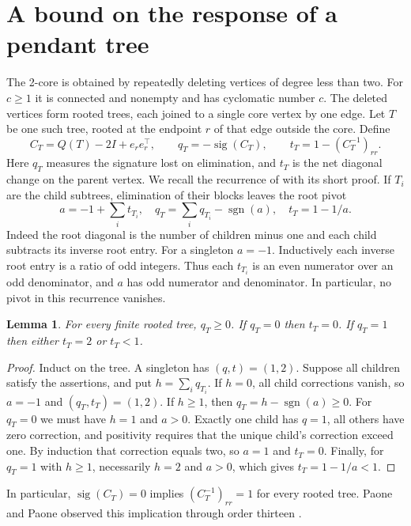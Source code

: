 \documentclass[11pt]{article}
\newtheorem{lemma}[theorem]{Lemma}
\newcommand{\sg}{\operatorname{sig}}
\begin{document}
\section{A bound on the response of a pendant tree}
The 2-core is obtained by repeatedly deleting vertices of degree less than two. For $c\ge1$ it is connected and nonempty and has cyclomatic number $c$. The deleted vertices form rooted trees, each joined to a single core vertex by one edge. Let $T$ be one such tree, rooted at the endpoint $r$ of that edge outside the core. Define
\[
 C_T=Q(T)-2I+e_re_r^\top,\qquad
 q_T=-\sg(C_T),\qquad t_T=1-(C_T^{-1})_{rr}.
\]
Here $q_T$ measures the signature lost on elimination, and $t_T$ is the net diagonal change on the parent vertex. We recall the recurrence of \cite[Lemma 3.5 and Proposition 3.7]{pp} with its short proof. If $T_i$ are the child subtrees, elimination of their blocks leaves the root pivot
\begin{equation}\label{eq:rec}
 a=-1+\sum_i t_{T_i},\quad
 q_T=\sum_i q_{T_i}-\operatorname{sgn}(a),\quad
 t_T=1-1/a.
\end{equation}
Indeed the root diagonal is the number of children minus one and each child subtracts its inverse root entry. For a singleton $a=-1$. Inductively each inverse root entry is a ratio of odd integers. Thus each $t_{T_i}$ is an even numerator over an odd denominator, and $a$ has odd numerator and denominator. In particular, no pivot in this recurrence vanishes.

\begin{lemma}\label{lem:tree}
For every finite rooted tree, $q_T\ge0$. If $q_T=0$ then $t_T=0$. If $q_T=1$ then either $t_T=2$ or $t_T<1$.
\end{lemma}
\begin{proof}
Induct on the tree. A singleton has $(q,t)=(1,2)$. Suppose all children satisfy the assertions, and put $h=\sum_i q_{T_i}$. If $h=0$, all child corrections vanish, so $a=-1$ and $(q_T,t_T)=(1,2)$. If $h\ge1$, then $q_T=h-\operatorname{sgn}(a)\ge0$. For $q_T=0$ we must have $h=1$ and $a>0$. Exactly one child has $q=1$, all others have zero correction, and positivity requires that the unique child's correction exceed one. By induction that correction equals two, so $a=1$ and $t_T=0$. Finally, for $q_T=1$ with $h\ge1$, necessarily $h=2$ and $a>0$, which gives $t_T=1-1/a<1$.
\end{proof}
In particular, $\sg(C_T)=0$ implies $(C_T^{-1})_{rr}=1$ for every rooted tree. Paone and Paone observed this implication through order thirteen \cite[Remark 3.9]{pp}.
\end{document}
